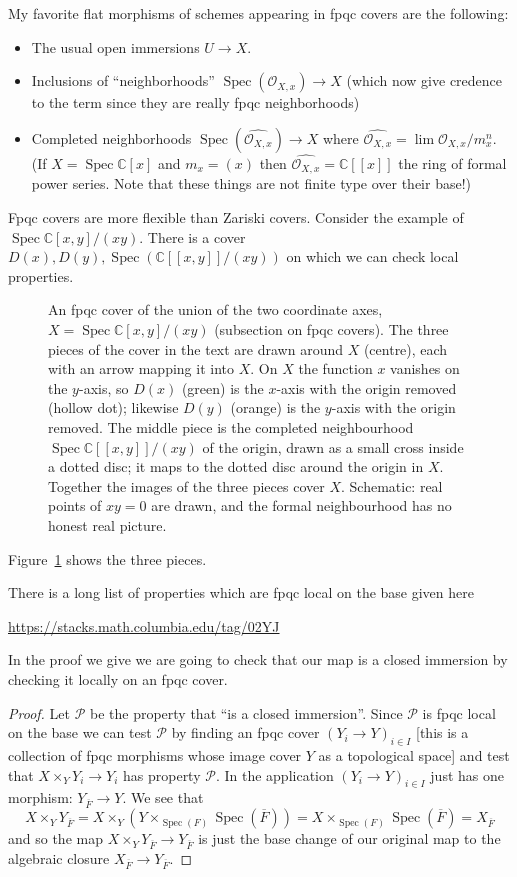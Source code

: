 \documentclass[12pt]{article}
\numberwithin{equation}{section}
\theoremstyle{definition}
\theoremstyle{remark}
\newcommand{\CC}{\mathbb{C}}
\newcommand{\Ocal}{\mathcal{O}}
\newcommand{\Spec}{\operatorname{Spec}}
\newcommand{\Pcal}{\mathcal{P}}
\newcommand{\Fbar}{\overline{F}}
\begin{document}
My favorite flat morphisms of schemes appearing in fpqc covers are the following:
\begin{itemize}
	\item The usual open immersions $U\to X$.
	\item Inclusions of ``neighborhoods'' $\Spec(\Ocal_{X,x}) \to X$ (which now give credence to the term since they are really fpqc neighborhoods)
	\item Completed neighborhoods $\Spec( \widehat{\Ocal_{X,x}}) \to X$ where $\widehat{\Ocal_{X,x}}= \lim \Ocal_{X,x}/m_x^n$. (If $X = \Spec \CC[x]$ and $m_x = (x)$ then $\widehat{\Ocal_{X,x}} = \CC[[x]]$ the ring of formal power series. Note that these things are not finite type over their base!)
\end{itemize}
Fpqc covers are more flexible than Zariski covers. 
Consider the example of $\Spec \CC[x,y]/(xy)$.
There is a cover $D(x), D(y), \Spec(\CC[[x,y]]/(xy))$ on which we can check local properties.
\begin{figure}[H]
\centering

\caption{An fpqc cover of the union of the two coordinate axes, $X=\Spec\CC[x,y]/(xy)$ (subsection on fpqc covers). The three pieces of the cover in the text are drawn around $X$ (centre), each with an arrow mapping it into $X$. On $X$ the function $x$ vanishes on the $y$-axis, so $D(x)$ (green) is the $x$-axis with the origin removed (hollow dot); likewise $D(y)$ (orange) is the $y$-axis with the origin removed. The middle piece is the completed neighbourhood $\Spec\CC[[x,y]]/(xy)$ of the origin, drawn as a small cross inside a dotted disc; it maps to the dotted disc around the origin in $X$. Together the images of the three pieces cover $X$. Schematic: real points of $xy=0$ are drawn, and the formal neighbourhood has no honest real picture.}\label{fig:fpqc-cover-axes}
\end{figure}
Figure~\ref{fig:fpqc-cover-axes} shows the three pieces.

There is a long list of properties which are fpqc local on the base given here
\begin{center}
	\url{https://stacks.math.columbia.edu/tag/02YJ}
\end{center}
In the proof we give we are going to check that our map is a closed immersion by checking it locally on an fpqc cover.

\begin{proof}
	Let $\Pcal$ be the property that ``is a closed immersion''.
	Since $\Pcal$ is fpqc local on the base we can test $\Pcal$ by finding an fpqc cover $(Y_i\to Y)_{i\in I}$ [this is a collection of fpqc morphisms whose image cover $Y$ as a topological space] and test that $X\times_Y Y_i \to Y_i$ has property $\Pcal$.
	In the application $(Y_i\to Y)_{i\in I}$ just has one morphism: $Y_{\Fbar} \to Y$.
	We see that 
	$$X\times_Y Y_{\Fbar} = X \times_Y (Y\times_{\Spec(F) } \Spec(\Fbar) ) = X \times_{\Spec(F)} \Spec(\Fbar) = X_{\Fbar}$$
	and so the map $X\times_Y Y_{\Fbar} \to Y_{\Fbar}$ is just the base change of our original map to the algebraic closure $X_{\Fbar} \to Y_{\Fbar}$.
\end{proof}
\end{document}
